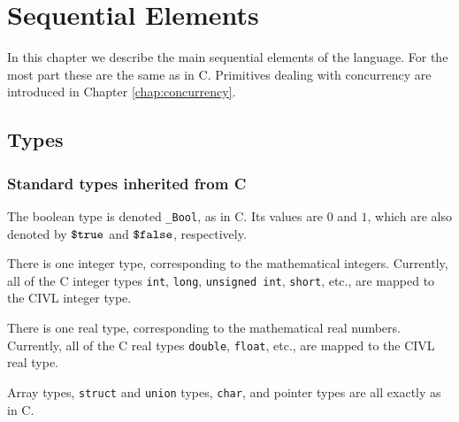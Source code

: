 








\chapter{Sequential Elements}

In this chapter we describe the main sequential elements of the
language.  For the most part these are the same as in C.
Primitives dealing with concurrency are introduced in Chapter
\ref{chap:concurrency}.

\section{Types}

\subsection{Standard types inherited from C}

The boolean type is denoted \verb!_Bool!, as in C. Its values are $0$
and $1$, which are also denoted by $\mbox{\texttt{\${}true}}$ and $\mbox{\texttt{\${}false}}$,
respectively.

There is one integer type, corresponding to the mathematical integers.
Currently, all of the C integer types \texttt{int}, \texttt{long},
\texttt{unsigned\ int}, \texttt{short}, etc., are mapped to the CIVL
integer type.

There is one real type, corresponding to the mathematical real
numbers. Currently, all of the C real types \texttt{double},
\texttt{float}, etc., are mapped to the CIVL real type.

Array types, \texttt{struct} and \texttt{union} types, \texttt{char},
and pointer types are all exactly as in C.


